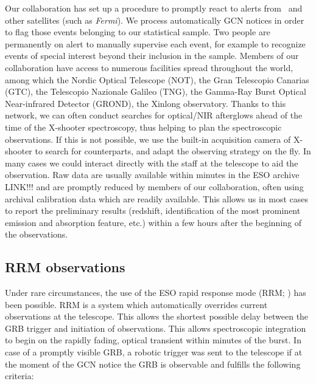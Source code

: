 \documentclass{aa}    %
\begin{document}
Our collaboration has set up a procedure to promptly react to alerts from
\swift~and other satellites (such as \textit{Fermi}). We process automatically
GCN notices in order to flag those events belonging to our statistical sample.
Two people are permanently on alert to manually supervise each event, for
example to recognize events of special interest beyond their inclusion in the
sample. Members of our collaboration have access to numerous facilities spread
throughout the world, among which the Nordic Optical Telescope (NOT), the Gran
Telescopio Canarias (GTC), the Telescopio Nazionale Galileo (TNG), the Gamma-Ray
Burst Optical Near-infrared Detector (GROND), the Xinlong observatory. Thanks to
this network, we can often conduct searches for optical/NIR afterglows ahead of
the time of the X-shooter spectroscopy, thus helping to plan the spectroscopic
observations. If this is not possible, we use the built-in acquisition camera of
X-shooter to search for counterparts, and adapt the observing strategy on the
fly. In many cases we could interact directly with the staff at the telescope to
aid the observation. Raw data are usually available within minutes in the ESO
archive LINK!!! and are promptly reduced by members of our collaboration, often
using archival calibration data which are readily available. This allows us in
most cases to report the preliminary results (redshift, identification of the
most prominent emission and absorption feature, etc.) within a few hours after
the beginning of the observations.


\subsection{RRM observations} \label{RRM}

Under rare circumstances, the use of the ESO rapid response mode (RRM;
\citealt{Vreeswijk2010}) has been possible. RRM is a system which automatically
overrides current observations at the telescope. This allows the shortest
possible delay between the GRB trigger and initiation of observations. This
allows spectroscopic integration to begin on the rapidly fading, optical
transient within minutes of the burst. In case of a promptly visible GRB, a
robotic trigger was sent to the telescope if at the moment of the GCN notice the
GRB is observable and fulfills the following criteria:
\end{document}
